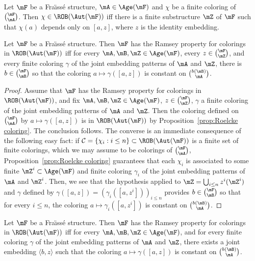 \begin{prop}\label{prop:Roelcke coloring}
Let $\mF$ be a Fra\"{\i}ss\'e structure, $\mA\in \Age(\mF)$ and $\chi$ be a finite coloring of $\binom{\mF}{\mA}$. Then $\chi\in \ROB(\Aut(\mF))$ iff there is a finite substructure $\mZ$ of $\mF$ such that $\chi(a)$ depends only on $[a,z]$, where $z$ is the identity embedding.
\end{prop}

\begin{prop}\label{prop:RoelckeRP}
Let $\mF$ be a Fra\"{\i}ss\'e structure. Then $\mF$ has the Ramsey property for colorings in $\ROB(\Aut(\mF))$ iff for every $\mA, \mB, \mZ\in \Age(\mF)$, every $z\in \binom{\mF}{\mZ}$, and every finite coloring $\gamma$ of the joint embedding patterns of $\mA$ and $\mZ$, there is $b\in \binom{\mF}{\mB}$ so that the coloring $a\mapsto \gamma([a,z])$ is constant on $\binom{b(\mB)}{\mA}$.
\end{prop}

\begin{proof}
Assume that $\mF$ has the Ramsey property for colorings in $\ROB(\Aut(\mF))$, and fix $\mA, \mB, \mZ\in \Age(\mF)$, $z\in \binom{\mF}{\mZ}$, $\gamma$ a finite coloring of the joint embedding patterns of $\mA$ and $\mZ$. Then the coloring defined on $\binom{\mF}{\mA}$ by $a\mapsto \gamma([a,z])$ is in $\ROB(\Aut(\mF))$ by Proposition~\ref{prop:Roelcke coloring}. The conclusion follows. The converse is an immediate consequence of the following easy fact: if $\mathcal C = \{ \chi_{i}:i\leq n\} \subset \ROB(\Aut(\mF))$ is a finite set of finite colorings, which we may assume to be colorings of $\binom{\mF}{\mA}$, Proposition~\ref{prop:Roelcke coloring} guarantees that each $\chi_{i}$ is associated to some finite $\mZ^{i}\subset \Age(\mF)$ and finite coloring $\gamma_{i}$ of the joint embedding patterns of $\mA$ and $\mZ^{i}$. Then, we see that the hypothesis applied to $\mZ=\bigcup_{i\leq n}z^{i}(\mZ^{i})$ and $\gamma$ defined by $\gamma([a,z]) = (\gamma_{i}([a,z^{i}]))_{i\leq n}$ provides $b\in \binom{\mF}{\mB}$ so that for every $i\leq n$, the coloring $a\mapsto \gamma_{i}([a,z^{i}])$ is constant on $\binom{b(\mB)}{\mA}$.
\end{proof}

\begin{prop}\label{prop:RPRoelcke}
Let $\mF$ be a Fra\"{\i}ss\'e structure. Then $\mF$ has the Ramsey property for colorings in $\ROB(\Aut(\mF))$ iff for every $\mA, \mB, \mZ\in \Age(\mF)$, and for every finite coloring $\gamma$ of the joint embedding patterns of $\mA$ and $\mZ$, there exists a joint embedding $\langle b,z\rangle$ such that the coloring $a\mapsto \gamma([a,z])$ is constant on $\binom{b(\mB)}{\mA}$.
\end{prop}


